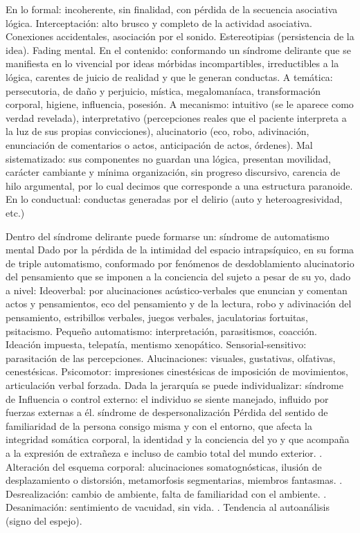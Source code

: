 En lo formal: incoherente, sin finalidad, con pérdida de la secuencia asociativa lógica. Interceptación: alto brusco y completo de la actividad asociativa. Conexiones accidentales, asociación por el sonido. Estereotipias (persistencia de la idea). Fading mental. 
En el contenido: conformando un síndrome delirante que se manifiesta en lo vivencial por ideas mórbidas incompartibles, irreductibles a la lógica, carentes de juicio de realidad y que le generan conductas. 
A temática: persecutoria, de daño y perjuicio, mística, megalomaníaca, transformación corporal, higiene, influencia, posesión. 
A mecanismo: intuitivo (se le aparece como verdad revelada), interpretativo (percepciones reales que el paciente interpreta a la luz de sus propias convicciones), alucinatorio (eco, robo, adivinación, enunciación de comentarios o actos, anticipación de actos, órdenes). Mal sistematizado: sus componentes no guardan una lógica, presentan movilidad, carácter cambiante y mínima organización, sin progreso discursivo, carencia de hilo argumental, por lo cual decimos que corresponde a una estructura paranoide. En lo conductual: conductas generadas por el delirio (auto y heteroagresividad, etc.) 

Dentro del síndrome delirante puede formarse un: síndrome de automatismo mental Dado por la pérdida de la intimidad del espacio intrapsíquico, en su forma de triple automatismo, conformado por fenómenos de desdoblamiento alucinatorio del pensamiento que se imponen a la conciencia del sujeto a pesar de su yo, dado a nivel: Ideoverbal: por alucinaciones acústico-verbales que enuncian y comentan actos y pensamientos, eco del pensamiento y de la lectura, robo y adivinación del pensamiento, estribillos verbales, juegos verbales, jaculatorias fortuitas, psitacismo. Pequeño automatismo: interpretación, parasitismos, coacción. Ideación impuesta, telepatía, mentismo xenopático. Sensorial-sensitivo: parasitación de las percepciones. Alucinaciones: visuales, gustativas, olfativas, cenestésicas. Psicomotor: impresiones cinestésicas de imposición de movimientos, articulación verbal forzada. Dada la jerarquía se puede individualizar: síndrome de Influencia o control externo: el individuo se siente manejado, influido por fuerzas externas a él. síndrome de despersonalización Pérdida del sentido de familiaridad de la persona consigo misma y con el entorno, que afecta la integridad somática corporal, la identidad y la conciencia del yo y que acompaña a la expresión de extrañeza e incluso de cambio total del mundo exterior. . Alteración del esquema corporal: alucinaciones somatognósticas, ilusión de desplazamiento o distorsión, metamorfosis segmentarias, miembros fantasmas. . Desrealización: cambio de ambiente, falta de familiaridad con el ambiente. . Desanimación: sentimiento de vacuidad, sin vida. . Tendencia al autoanálisis (signo del espejo). 

